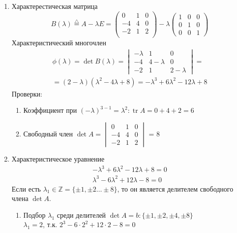 \documentclass{article}
\DeclareMathOperator*{\Tr}{tr}
\begin{document}
\begin{enumerate}
	\item Характерестическая матрица
	\[
		B(\lambda) \stackrel{\triangle}{=} A - \lambda E = \begin{pmatrix}
			0 & 1 & 0 \\
			-4 & 4 & 0 \\
			-2 & 1 & 2 \\
		\end{pmatrix} - \lambda \begin{pmatrix}
			1 & 0 & 0 \\
			0 & 1 & 0 \\
			0 & 0 & 1
		\end{pmatrix}
	\]
	Характеристический многочлен
	\begin{gather*}
		\phi (\lambda) = \det B(\lambda) = \begin{vmatrix}
			-\lambda & 1 & 0 \\
			-4 & 4 - \lambda & 0 \\
			-2 & 1 & 2 - \lambda
		\end{vmatrix} = \\
		= (2 - \lambda)(\lambda^2 - 4\lambda + 8) = -\lambda^3 + 6\lambda^2 - 12\lambda + 8
	\end{gather*}
	Проверки: \begin{enumerate}
		\item Коэффициент при $(-\lambda)^{3-1} = \lambda^2 : \Tr A = 0 + 4 + 2 = 6$
		\item Свободный член $\det A = \begin{vmatrix}
			0 & 1 & 0 \\
			-4 & 4 & 0 \\
			-2 & 1 & 2
		\end{vmatrix}$ = 8
	\end{enumerate}
	\item Характеристическое уравнение
	\begin{gather*}
		-\lambda^3 + 6\lambda^2 - 12\lambda + 8 = 0 \\
		\lambda^3 - 6\lambda^2 + 12\lambda - 8 = 0
	\end{gather*}
	Если есть $\lambda_1 \in \mathbb{Z} = \{ \pm 1, \pm 2 \dots \pm 8 \}$,
	то он является делителем свободного члена $\det A$.
	\begin{enumerate}
		\item Подбор $\lambda_1$ среди делителей $\det A = b : \{\pm 1, \pm 2, \pm 4, \pm 8 \}$ \\
		$\lambda_1 = 2$, т.к. $2^3 - 6 \cdot 2^2 + 12 \cdot 2 - 8 = 0$

\end{enumerate}
\end{enumerate}
\end{document}
